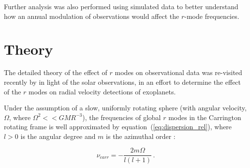 Further analysis was also performed using simulated data to better understand how an annual modulation of observations would affect the $r$-mode frequencies.


%
%



\section{Theory}\label{sec:r-mode_theory}

The detailed theory of the effect of $r$ modes on observational data was re-visited recently by \citet{lanza_sectoral_2019} in light of the solar observations, in an effort to determine the effect of the $r$ modes on radial velocity detections of exoplanets.

Under the assumption of a slow, uniformly rotating sphere (with angular velocity, $\Omega$, where $\Omega^2 << GMR^{-3}$), the frequencies of global $r$ modes in the Carrington rotating frame is well approximated by equation~(\ref{eq:dispersion_rel}), where $l > 0$ is the angular degree and $m$ is the azimuthal order \citep{loptien_global-scale_2018, lanza_sectoral_2019}:

\begin{equation}
\nu_{carr} = - \frac{2m\Omega}{l(l + 1)} \, .
\label{eq:dispersion_rel}
\end{equation}

